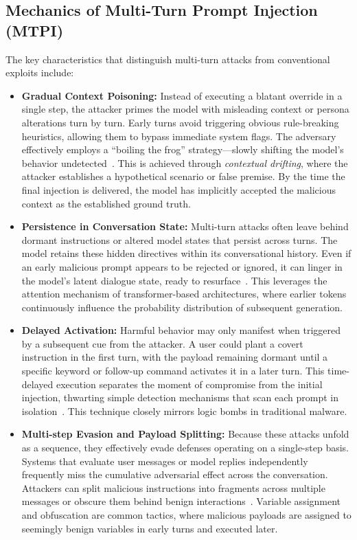 \documentclass[10pt, a4paper, twocolumn]{article}
\begin{document}
\subsection{Mechanics of Multi-Turn Prompt Injection (MTPI)}
The key characteristics that distinguish multi-turn attacks from conventional exploits include:

\begin{itemize}
    \item \textbf{Gradual Context Poisoning:} Instead of executing a blatant override in a single step, the attacker primes the model with misleading context or persona alterations turn by turn. Early turns avoid triggering obvious rule-breaking heuristics, allowing them to bypass immediate system flags. The adversary effectively employs a ``boiling the frog'' strategy---slowly shifting the model’s behavior undetected~\cite{weng2025}. This is achieved through \textit{contextual drifting}, where the attacker establishes a hypothetical scenario or false premise. By the time the final injection is delivered, the model has implicitly accepted the malicious context as the established ground truth.
    
    \item \textbf{Persistence in Conversation State:} Multi-turn attacks often leave behind dormant instructions or altered model states that persist across turns. The model retains these hidden directives within its conversational history. Even if an early malicious prompt appears to be rejected or ignored, it can linger in the model’s latent dialogue state, ready to resurface~\cite{feng2024}. This leverages the attention mechanism of transformer-based architectures, where earlier tokens continuously influence the probability distribution of subsequent generation.
    
    \item \textbf{Delayed Activation:} Harmful behavior may only manifest when triggered by a subsequent cue from the attacker. A user could plant a covert instruction in the first turn, with the payload remaining dormant until a specific keyword or follow-up command activates it in a later turn. This time-delayed execution separates the moment of compromise from the initial injection, thwarting simple detection mechanisms that scan each prompt in isolation~\cite{ha2025}. This technique closely mirrors logic bombs in traditional malware.
    
    \item \textbf{Multi-step Evasion and Payload Splitting:} Because these attacks unfold as a sequence, they effectively evade defenses operating on a single-step basis. Systems that evaluate user messages or model replies independently frequently miss the cumulative adversarial effect across the conversation. Attackers can split malicious instructions into fragments across multiple messages or obscure them behind benign interactions~\cite{wang2024}. Variable assignment and obfuscation are common tactics, where malicious payloads are assigned to seemingly benign variables in early turns and executed later.
    

\end{itemize}
\end{document}
